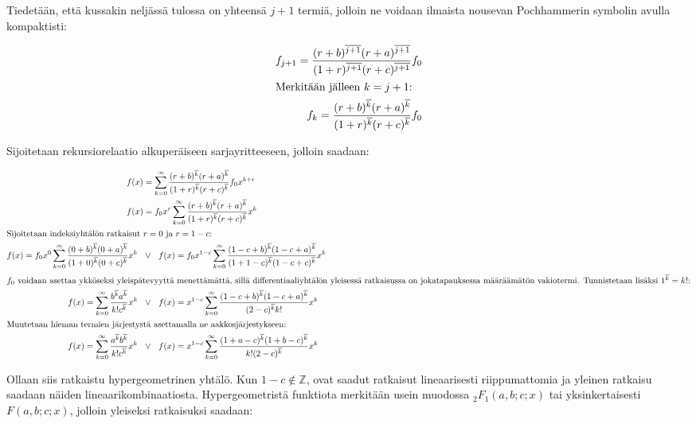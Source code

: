 \documentclass[../johdoksia.tex]{subfiles}
\begin{document}
	\noindent Tiedetään, että kussakin neljässä tulossa on yhteensä $j + 1$ termiä, jolloin ne voidaan ilmaista nousevan Pochhammerin symbolin avulla kompaktisti:
	
	\begin{align*}
		f_{j + 1} = \frac{(r + b)^{\overline{j + 1}}(r + a)^{\overline{j + 1}}}{(1 + r)^{\overline{j + 1}}(r + c)^{\overline{j + 1}}}f_0 \\
		\intertext{Merkitään jälleen $k = j + 1$:}
		f_{k} = \frac{(r + b)^{\overline{k}}(r + a)^{\overline{k}}}{(1 + r)^{\overline{k}}(r + c)^{\overline{k}}}f_0 \\
	\end{align*}

	Sijoitetaan rekursiorelaatio alkuperäiseen sarjayritteeseen, jolloin saadaan:
	
	\begin{align*}
		f(x) &= \sum_{k = 0}^{\infty}\frac{(r + b)\risingfact{k}(r + a)\risingfact{k}}{(1 + r)\risingfact{k}(r + c)\risingfact{k}}f_0x^{k + r} \\
		f(x) &= f_0x^r\sum_{k = 0}^{\infty}\frac{(r + b)\risingfact{k}(r + a)\risingfact{k}}{(1 + r)\risingfact{k}(r + c)\risingfact{k}}x^{k} \\
		\intertext{Sijoitetaan indeksiyhtälön ratkaisut $r = 0$ ja $r = 1 - c$:}
		f(x) = f_0x^0\sum_{k = 0}^{\infty}\frac{(0 + b)\risingfact{k}(0 + a)\risingfact{k}}{(1 + 0)\risingfact{k}(0 + c)\risingfact{k}}x^{k} \ \ &\lor \ \ f(x) = f_0x^{1 - c}\sum_{k = 0}^{\infty}\frac{(1 - c + b)\risingfact{k}(1 - c + a)\risingfact{k}}{(1 + 1 - c)\risingfact{k}(1 - c + c)\risingfact{k}}x^{k} \\
		\intertext{$f_0$ voidaan asettaa ykköseksi yleispätevyyttä menettämättä, sillä differentiaaliyhtälön yleisessä ratkaisussa on jokatapauksessa määräämätön vakiotermi. Tunnistetaan lisäksi $1\risingfact{k} = k!$:}
		f(x) = \sum_{k = 0}^{\infty}\frac{b\risingfact{k}a\risingfact{k}}{k!c\risingfact{k}}x^{k} \ \ &\lor \ \ f(x) = x^{1 - c}\sum_{k = 0}^{\infty}\frac{(1 - c + b)\risingfact{k}(1 - c + a)\risingfact{k}}{(2 - c)\risingfact{k}k!}x^{k} \\
		\intertext{Muutetaan hieman termien järjestystä asettamalla ne aakkosjärjestykseen:}
		f(x) = \sum_{k = 0}^{\infty}\frac{a\risingfact{k}b\risingfact{k}}{k!c\risingfact{k}}x^{k} \ \ &\lor \ \ f(x) = x^{1 - c}\sum_{k = 0}^{\infty}\frac{(1 + a - c)\risingfact{k}(1 + b - c)\risingfact{k}}{k!(2 - c)\risingfact{k}}x^{k}
	\end{align*}

	Ollaan siis ratkaistu hypergeometrinen yhtälö. Kun $1 - c \notin \mathbb{Z}$, ovat saadut ratkaisut lineaarisesti riippumattomia ja yleinen ratkaisu saadaan näiden lineaarikombinaatiosta. Hypergeometristä funktiota merkitään usein muodossa ${_2{F}_1}(a, b; c; x)$ tai yksinkertaisesti $F(a, b; c; x)$, jolloin yleiseksi ratkaisuksi saadaan:
	
\end{document}
